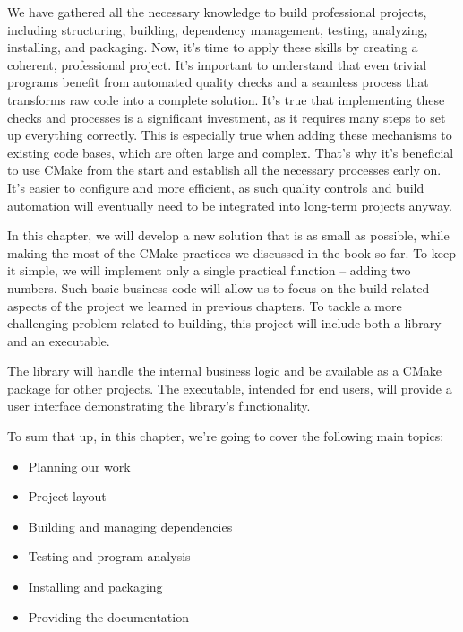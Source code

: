 We have gathered all the necessary knowledge to build professional projects, including structuring, building, dependency management, testing, analyzing, installing, and packaging. Now, it’s time to apply these skills by creating a coherent, professional project. It’s important to understand that even trivial programs benefit from automated quality checks and a seamless process that transforms raw code into a complete solution. It’s true that implementing these checks and processes is a significant investment, as it requires many steps to set up everything correctly. This is especially true when adding these mechanisms to existing code bases, which are often large and complex. That’s why it’s beneficial to use CMake from the start and establish all the necessary processes early on. It’s easier to configure and more efficient, as such quality controls and build automation will eventually need to be integrated into long-term projects anyway.

In this chapter, we will develop a new solution that is as small as possible, while making the most of the CMake practices we discussed in the book so far. To keep it simple, we will implement only a single practical function – adding two numbers. Such basic business code will allow us to focus on the build-related aspects of the project we learned in previous chapters. To tackle a more challenging problem related to building, this project will include both a library and an executable.

The library will handle the internal business logic and be available as a CMake package for other projects. The executable, intended for end users, will provide a user interface demonstrating the library’s functionality.

To sum that up, in this chapter, we’re going to cover the following main topics:

\begin{itemize}
\item
Planning our work

\item
Project layout

\item
Building and managing dependencies

\item
Testing and program analysis

\item
Installing and packaging

\item
Providing the documentation
\end{itemize}